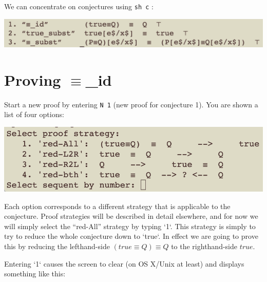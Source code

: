 \documentclass[11pt]{article}
\begin{document}
We can concentrate on conjectures using \verb"sh c" :

\includegraphics[scale=0.75]{doc/images/equiv_conjectures.png}



\section{Proving $\equiv$\_id}

Start a new proof by entering \verb"N 1" (new proof for conjecture 1).
You are shown a list of four options:

\includegraphics[scale=0.75]{doc/images/select_strategy.png}

Each option corresponds to a different strategy that is applicable
to the conjecture.
Proof strategies will be described in detail elsewhere,
and for now we will simply select the ``red-All'' strategy by typing `1`. 
This strategy is simply to try to reduce the whole conjecture down to `true`.
In effect we are going to prove this by reducing the lefthand-side
$(true\equiv Q) \equiv Q$ to the righthand-side $true$.

Entering `1` causes the screen to clear (on OS X/Unix at least)
and displays something like this:
\end{document}

